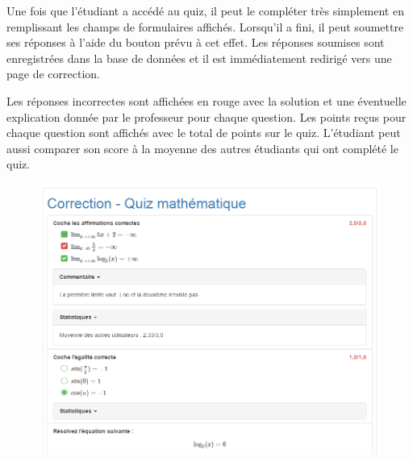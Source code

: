 \documentclass[a4,10pt,french]{sphinxmanual}
\begin{document}
Une fois que l'étudiant a accédé au quiz, il peut le compléter très simplement en remplissant les champs de formulaires affichés. Lorsqu'il a fini, il peut soumettre ses réponses à l'aide du bouton prévu à cet effet. Les réponses soumises sont enregistrées dans la base de données et il est immédiatement redirigé vers une page de correction.

Les réponses incorrectes sont affichées en rouge avec la solution et une éventuelle explication donnée par le professeur pour chaque question. Les points reçus pour chaque question sont affichés avec le total de points sur le quiz. L'étudiant peut aussi comparer son score à la moyenne des autres étudiants qui ont complété le quiz.
\begin{figure}[htbp]
\centering

\includegraphics{correct.png}
\end{figure}
\end{document}
